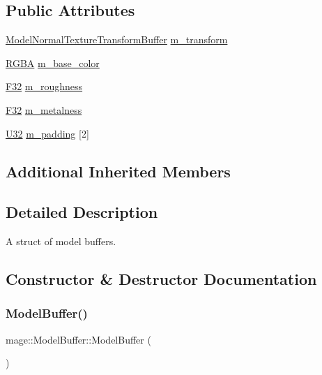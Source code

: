 \subsection*{Public Attributes}
\begin{DoxyCompactItemize}
\item 
\hyperlink{structmage_1_1_model_normal_texture_transform_buffer}{Model\+Normal\+Texture\+Transform\+Buffer} \hyperlink{structmage_1_1_model_buffer_adb77c7da1573f0d94665b73ea1887420}{m\+\_\+transform}
\item 
\hyperlink{structmage_1_1_r_g_b_a}{R\+G\+BA} \hyperlink{structmage_1_1_model_buffer_aaad37de854c5ba951107d2c18880fbbd}{m\+\_\+base\+\_\+color}
\item 
\hyperlink{namespacemage_aa97e833b45f06d60a0a9c4fc22ae02c0}{F32} \hyperlink{structmage_1_1_model_buffer_a33adb9ff193fcccf618bf6ceb7b1a31e}{m\+\_\+roughness}
\item 
\hyperlink{namespacemage_aa97e833b45f06d60a0a9c4fc22ae02c0}{F32} \hyperlink{structmage_1_1_model_buffer_a1be491fffd79c3e5d37d066f0ef9ab96}{m\+\_\+metalness}
\item 
\hyperlink{namespacemage_a41c104c036fba3756a74e19f793eeaa1}{U32} \hyperlink{structmage_1_1_model_buffer_a11ae104f8ba32afbd910a2f18d04d352}{m\+\_\+padding} \mbox{[}2\mbox{]}
\end{DoxyCompactItemize}
\subsection*{Additional Inherited Members}


\subsection{Detailed Description}
A struct of model buffers. 

\subsection{Constructor \& Destructor Documentation}
\hypertarget{structmage_1_1_model_buffer_a9069cfb6d75067b7f1509332fbec9be0}{}\label{structmage_1_1_model_buffer_a9069cfb6d75067b7f1509332fbec9be0} 
\subsubsection{\texorpdfstring{Model\+Buffer()}{ModelBuffer()}\hspace{0.1cm}{\footnotesize\ttfamily [1/3]}}
{\footnotesize\ttfamily mage\+::\+Model\+Buffer\+::\+Model\+Buffer (\begin{DoxyParamCaption}{ }\end{DoxyParamCaption})}

